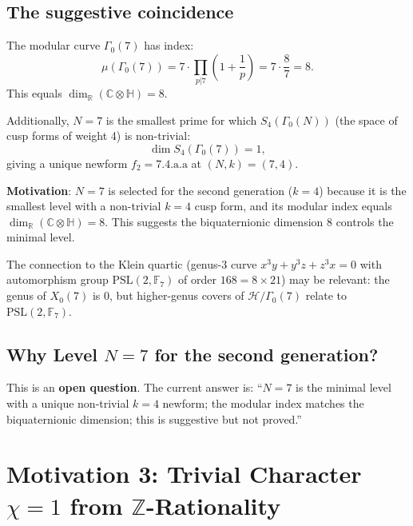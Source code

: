 \documentclass[12pt]{article}
\theoremstyle{definition}
\theoremstyle{remark}
\begin{document}
\subsection{The suggestive coincidence}

The modular curve $\Gamma_0(7)$ has index:
\begin{equation}
  \mu(\Gamma_0(7)) = 7\cdot\prod_{p|7}\left(1 + \frac{1}{p}\right) = 7\cdot\frac{8}{7} = 8.
\end{equation}
This equals $\dim_{\mathbb{R}}(\mathbb{C}\otimes\mathbb{H}) = 8$.

Additionally, $N = 7$ is the smallest prime for which $S_4(\Gamma_0(N))$ (the space
of cusp forms of weight 4) is non-trivial:
\begin{equation}
  \dim S_4(\Gamma_0(7)) = 1,
\end{equation}
giving a unique newform $f_2 = \text{7.4.a.a}$ at $(N,k) = (7,4)$.

\begin{motivatebox}
\textbf{Motivation}: $N = 7$ is selected for the second generation ($k = 4$)
because it is the smallest level with a non-trivial $k=4$ cusp form, and its
modular index equals $\dim_{\mathbb{R}}(\mathbb{C}\otimes\mathbb{H}) = 8$.
This suggests the biquaternionic dimension $8$ controls the minimal level.
\end{motivatebox}

The connection to the Klein quartic (genus-3 curve $x^3y + y^3z + z^3x = 0$
with automorphism group $\mathrm{PSL}(2,\mathbb{F}_7)$ of order $168 = 8 \times 21$)
may be relevant: the genus of $X_0(7)$ is 0, but higher-genus covers of
$\mathcal{H}/\Gamma_0(7)$ relate to $\mathrm{PSL}(2,\mathbb{F}_7)$.

\subsection{Why Level $N = 7$ for the second generation?}

This is an \textbf{open question}.  The current answer is: ``$N = 7$ is the minimal
level with a unique non-trivial $k=4$ newform; the modular index matches the
biquaternionic dimension; this is suggestive but not proved.''

\section{Motivation 3: Trivial Character $\chi = 1$ from $\mathbb{Z}$-Rationality}
\label{sec:character}
\end{document}
